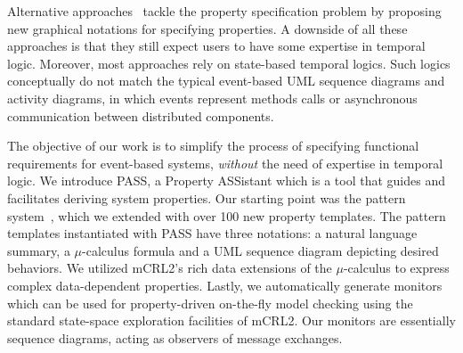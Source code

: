 \documentclass[letter]{llncs}
\begin{document}
Alternative
approaches~\cite{Autili:2007:GSS:1290845.1290859,Lee97agraphical,Smith:2001:ECG:882477.883639,Knapp:2006:MCU:1762828.1762836,Lilius99vuml:a,Kugler:2005:TLS:2140653.2140692,MVPSA}
tackle the property specification problem by proposing new graphical
notations for specifying properties. A downside of all these approaches is
that they still expect users to have some expertise in temporal logic.
Moreover, most approaches rely on state-based temporal logics. Such
logics conceptually do not match the typical event-based UML sequence
diagrams and activity diagrams, in which events represent methods calls
or asynchronous communication between distributed components.

The objective of our work is to simplify the process of specifying
functional requirements for event-based systems, \emph{without}
the need of expertise in temporal logic.  We introduce PASS,
a Property ASSistant which is a tool that guides and facilitates 
deriving system properties. Our starting point was the pattern
system~\cite{Dwyer:1999:PPS:302405.302672}, which we extended with over
100 new property templates. 
The pattern templates instantiated with PASS have three notations:
a natural language summary, a $\mu$-calculus formula and a UML sequence
diagram depicting desired behaviors.  We utilized mCRL2's rich data
extensions of the $\mu$-calculus to express complex data-dependent
properties.  Lastly, we automatically generate
monitors which can be used for property-driven on-the-fly model checking
using the standard state-space exploration facilities
of mCRL2.
Our monitors are essentially sequence diagrams, acting as
observers of message exchanges.
\end{document}
